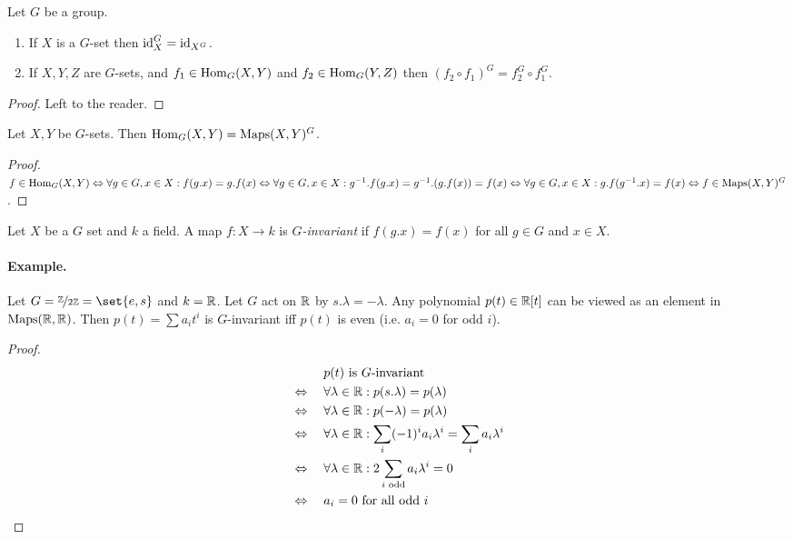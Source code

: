 \documentclass[12pt,a4paper]{scrartcl}
\begin{document}
\begin{otherlanguage}{english}
\begin{lem}
  Let $G$ be a group.
  \begin{enumerate}
    \item If $X$ is a $G$-set then $\operatorname{id}_X^G = \operatorname{id}_{X^G}$.
    \item If $X,Y,Z$ are $G$-sets, and $f_1 \in \operatorname{Hom}_G(X,Y)$ and $f_2\in \operatorname{Hom}_G(Y,Z)$ then $(f_2\circ f_1)^G = f_2^G \circ f_1^G$.
  \end{enumerate}
\end{lem}
\begin{proof}
  Left to the reader.
\end{proof}
\begin{lem}
  Let $X,Y$ be $G$-sets. Then $\operatorname{Hom}_G(X,Y) = \operatorname{Maps}(X,Y)^G$.
\end{lem}
\begin{proof}
  $f \in \operatorname{Hom}_G(X,Y) \Leftrightarrow \forall g\in G,x \in X: f(g.x) = g.f(x) \Leftrightarrow \forall g\in G,x \in X:g^{-1}.f(g.x) = g^{-1}.(g.f(x)) = f(x) \Leftrightarrow \forall g\in G,x \in X: g.f(g^{-1}.x) = f(x) \Leftrightarrow f\in \operatorname{Maps}(X,Y)^G$.
\end{proof}
\begin{defi}
  Let $X$ be a $G$ set and $k$ a field. A map $f\colon X\to k $ is \emph{$G$-invariant} if $f(g.x) = f(x)$ for all $g \in G$ and $x\in X$.
\end{defi}

\paragraph{Example.}
Let $G= \fak\IZ{2\IZ} = \set{e,s}$ and $k=\mathbb R$. Let $G$ act on $\mathbb R$ by $s.\lambda = -\lambda$. Any polynomial $p(t) \in \mathbb R[t]$ can be viewed as an element in $\operatorname{Maps}(\mathbb R,\mathbb R)$. Then $p(t) = \sum a_it^i$ is $G$-invariant iff $p(t)$ is even (i.e. $a_i=0$ for odd $i$).
\begin{proof}
  \begin{align*}
    &\phantom{{}\Leftrightarrow{}}\quad \text{$p(t)$ is $G$-invariant} \\
    &\Leftrightarrow\quad \forall \lambda \in \IR: p(s.\lambda) = p(\lambda) \\
    &\Leftrightarrow\quad \forall \lambda \in \IR: p(-\lambda) = p(\lambda) \\
    &\Leftrightarrow\quad \forall \lambda \in \IR: \sum_i (-1)^ia_i \lambda^i = \sum_i a_i \lambda^i \\
    &\Leftrightarrow\quad \forall \lambda \in \IR: 2 \sum_{\text{$i$ odd}} a_i\lambda^i = 0 \\
    &\Leftrightarrow\quad \text{$a_i=0$ for all odd $i$}
  \end{align*}
\end{proof}


\end{otherlanguage}
\end{document}
